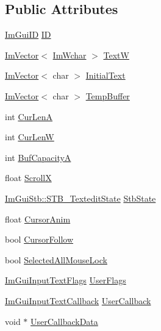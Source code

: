 \subsection*{Public Attributes}
\begin{DoxyCompactItemize}
\item 
\mbox{\hyperlink{imgui_8h_a1785c9b6f4e16406764a85f32582236f}{Im\+Gui\+ID}} \mbox{\hyperlink{struct_im_gui_input_text_state_a919642a77fb872cab950a011877c092b}{ID}}
\item 
\mbox{\hyperlink{class_im_vector}{Im\+Vector}}$<$ \mbox{\hyperlink{imgui_8h_af2c7badaf05a0008e15ef76d40875e97}{Im\+Wchar}} $>$ \mbox{\hyperlink{struct_im_gui_input_text_state_ad49ccde379925fb4238dcfa308aab418}{TextW}}
\item 
\mbox{\hyperlink{class_im_vector}{Im\+Vector}}$<$ char $>$ \mbox{\hyperlink{struct_im_gui_input_text_state_afd554be88b4f7cc0a8e217c02827d879}{Initial\+Text}}
\item 
\mbox{\hyperlink{class_im_vector}{Im\+Vector}}$<$ char $>$ \mbox{\hyperlink{struct_im_gui_input_text_state_a727a3be3486e713f04167c983211a040}{Temp\+Buffer}}
\item 
int \mbox{\hyperlink{struct_im_gui_input_text_state_abdba2cb00ac67ee3464c469d7ada163b}{Cur\+LenA}}
\item 
int \mbox{\hyperlink{struct_im_gui_input_text_state_a5e0304d69cd5fa3fab05a1fd7b991375}{Cur\+LenW}}
\item 
int \mbox{\hyperlink{struct_im_gui_input_text_state_a0dcf0134962cfb09d085f14538a59dac}{Buf\+CapacityA}}
\item 
float \mbox{\hyperlink{struct_im_gui_input_text_state_a730a350758ad428d845d895f85770b7f}{ScrollX}}
\item 
\mbox{\hyperlink{struct_im_gui_stb_1_1_s_t_b___textedit_state}{Im\+Gui\+Stb\+::\+S\+T\+B\+\_\+\+Textedit\+State}} \mbox{\hyperlink{struct_im_gui_input_text_state_aa6636d73a5dfeb752c737c9d66121b5f}{Stb\+State}}
\item 
float \mbox{\hyperlink{struct_im_gui_input_text_state_a95520b8289da18da2ca6480a64894516}{Cursor\+Anim}}
\item 
bool \mbox{\hyperlink{struct_im_gui_input_text_state_a8cfd858a20e7154e235cc6288fdae6f0}{Cursor\+Follow}}
\item 
bool \mbox{\hyperlink{struct_im_gui_input_text_state_a3ea23fdc7d6cc4983230055ba92bc422}{Selected\+All\+Mouse\+Lock}}
\item 
\mbox{\hyperlink{imgui_8h_a7d2c6153a6b9b5d3178ce82434ac9fb8}{Im\+Gui\+Input\+Text\+Flags}} \mbox{\hyperlink{struct_im_gui_input_text_state_a413a224016ccd2566de885d43445e976}{User\+Flags}}
\item 
\mbox{\hyperlink{imgui_8h_a65fd2b568a62c9aa2a28a8a13eb65ad7}{Im\+Gui\+Input\+Text\+Callback}} \mbox{\hyperlink{struct_im_gui_input_text_state_a416393864f1b6dbe9f446b197eb5e196}{User\+Callback}}
\item 
void $\ast$ \mbox{\hyperlink{struct_im_gui_input_text_state_a5b7922443d0aac7e81957cbf9ef64845}{User\+Callback\+Data}}
\end{DoxyCompactItemize}


